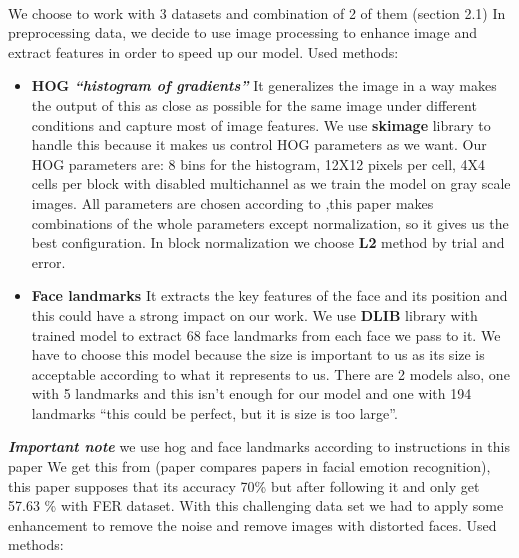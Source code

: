 \paragraph{}
We choose to work with 3 datasets and combination of 2 of them (section 2.1) \newline
In preprocessing data, we decide to use image processing to enhance image and extract features in order to speed up our model. \newline
Used methods: \newline
\begin{itemize}
\item \textbf{HOG \textit{“histogram of gradients”} }
\newline It generalizes the image in a way makes the output of this as close as possible for the same image under different conditions and capture most of image features. 
\newline We use \textbf{skimage} library to handle this because it makes us control HOG parameters as we want. 
\newline Our HOG parameters are: 8 bins for the histogram, 12X12 pixels per cell, 4X4 cells per block with disabled multichannel as we train the model on gray scale images. 
\newline All parameters are chosen according to \cite{hog},this paper makes combinations of the whole parameters except normalization, so it gives us the best configuration.
\newline
In block normalization we choose \textbf{L2} method by trial and error.
\item \textbf{Face landmarks }
\newline It extracts the key features of the face and its position and this could have a strong impact on our work. 
\newline We use \textbf{DLIB} library with trained model to extract 68 face landmarks from each face we pass to it. 
\newline We have to choose this model because the size is important to us as its size is acceptable according to what it represents to us. 
\newline There are 2 models also, one with 5 landmarks and this isn’t enough for our model and one with 194 landmarks “this could be perfect, but it is size is too large”.
\end{itemize}
\textbf{\textit{Important note }} we use hog and face landmarks according to instructions in this paper \cite{method_5}  \newline
We get this from \cite{state_of_art} (paper compares papers in facial emotion recognition), this paper supposes that its accuracy 70\% but after following it and only get 57.63 \% with FER dataset. \newline
With this challenging data set we had to apply some enhancement to remove the noise and remove images with distorted faces. \newline
Used methods: \newline

